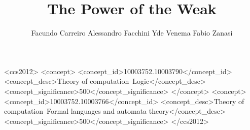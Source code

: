 \documentclass[prodmode,acmtecs]{acmsmall} %
\begin{document}

\title{The Power of the Weak}

\author{
Facundo Carreiro
Alessandro Facchini
Yde Venema
Fabio Zanasi
}



%
%
 \begin{CCSXML}
<ccs2012>
<concept>
 <concept_id>10003752.10003790</concept_id>
 <concept_desc>Theory of computation~Logic</concept_desc>
 <concept_significance>500</concept_significance>
 </concept>
 <concept>
 <concept_id>10003752.10003766</concept_id>
 <concept_desc>Theory of computation~Formal languages and automata theory</concept_desc>
 <concept_significance>500</concept_significance>
</ccs2012>
\end{CCSXML}






\maketitle

\newcommand{\invoeg}[1]{}

\invoeg{neutral/sec-introduction}
\invoeg{neutral/sec-prel}
\invoeg{neutral/sec-mso-mu}
\invoeg{neutral/sec4}
\invoeg{neutral/sec-wmso-automata}
\invoeg{neutral/sec-nmso-automata}
\invoeg{neutral/sec-mu2so}
\invoeg{neutral/sec-expr}






\end{document}
